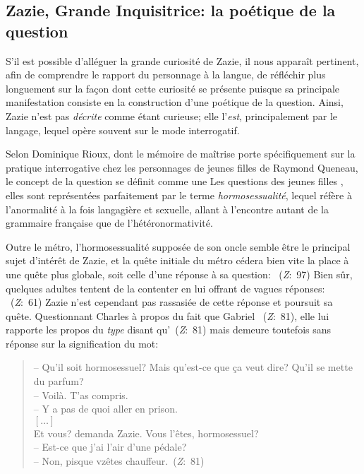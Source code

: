 \subsection{Zazie, Grande Inquisitrice: la poétique de la question}
S'il est possible d'alléguer la grande curiosité de Zazie, il nous apparaît pertinent, afin de comprendre le rapport du personnage à la langue, de réfléchir plus longuement sur la façon dont cette curiosité se présente puisque sa principale manifestation consiste en la construction d'une poétique de la question.
Ainsi, Zazie n'est pas \textit{décrite} comme étant curieuse; elle l'\textit{est}, principalement par le langage, lequel opère souvent sur le mode interrogatif.
\par
Selon Dominique Rioux, dont le mémoire de maîtrise porte spécifiquement sur la pratique interrogative chez les personnages de jeunes filles de Raymond Queneau, le concept de la question se définit comme une 
Les questions des jeunes filles , elles sont représentées parfaitement par le terme \textit{hormosessualité}, lequel réfère à l'anormalité à la fois langagière et sexuelle, allant à l'encontre autant de la grammaire française que de l'hétéronormativité.
\par
Outre le métro, l'hormosessualité supposée de son oncle semble être le principal sujet d'intérêt de Zazie, et la quête initiale du métro cédera bien vite la place à une quête plus globale, soit celle d'une réponse à sa question: ~(\textit{Z}:~97)
Bien sûr, quelques adultes tentent de la contenter en lui offrant de vagues réponses: ~(\textit{Z}:~61)
Zazie n'est cependant pas rassasiée de cette réponse et poursuit sa quête.
Questionnant Charles à propos du fait que Gabriel ~(\textit{Z}:~81), elle lui rapporte les propos du \textit{type} disant qu'~(\textit{Z}:~81) mais demeure toutefois sans réponse sur la signification du mot:
\begin{quote}
  \begin{singlespace}
    \small
    -- Qu'il soit hormosessuel? Mais qu'est-ce que ça veut dire? Qu'il se mette du parfum? \\
    -- Voilà. T'as compris. \\
    -- Y a pas de quoi aller en prison. \\
    $\left[ \dots \right]$ \\
    Et vous? demanda Zazie. Vous l'êtes, hormosessuel?\\
    -- Est-ce que j'ai l'air d'une pédale?\\
    -- Non, pisque vzêtes chauffeur.~(\textit{Z}:~81)
    \normalsize
  \end{singlespace}
\end{quote}
